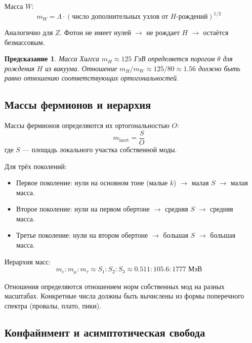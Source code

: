 \documentclass[12pt,a4paper]{article}
\newtheorem{prediction}{Предсказание}[section]
\begin{document}
Масса $W$:
\begin{equation}
    m_W = \Lambda \cdot (\text{число дополнительных узлов от } H\text{-рождений})^{1/2}
\end{equation}

Аналогично для $Z$. Фотон не имеет нулей $\to$ не рождает $H$ $\to$ остаётся безмассовым.

\begin{prediction}
Масса Хиггса $m_H \approx 125$ ГэВ определяется порогом $\theta$ для рождения $H$ из вакуума. Отношение $m_H / m_W \approx 125/80 \approx 1.56$ должно быть равно отношению соответствующих ортогональностей.
\end{prediction}

\subsection{Массы фермионов и иерархия}

Массы фермионов определяются их ортогональностью $O$:
\begin{equation}
    m_{\text{inert}} = \frac{S}{O}
\end{equation}
где $S$ — площадь локального участка собственной моды.

Для трёх поколений:
\begin{itemize}
    \item Первое поколение: нули на основном тоне (малые $k$) $\to$ малая $S$ $\to$ малая масса.
    \item Второе поколение: нули на первом обертоне $\to$ средняя $S$ $\to$ средняя масса.
    \item Третье поколение: нули на втором обертоне $\to$ большая $S$ $\to$ большая масса.
\end{itemize}

Иерархия масс:
\begin{equation}
    m_e : m_\mu : m_\tau \approx S_1 : S_2 : S_3 \approx 0.511 : 105.6 : 1777 \text{ МэВ}
\end{equation}

Отношения определяются отношением норм собственных мод на разных масштабах. Конкретные числа должны быть вычислены из формы поперечного спектра (провалы, плато, пики).

\subsection{Конфайнмент и асимптотическая свобода}
\end{document}
